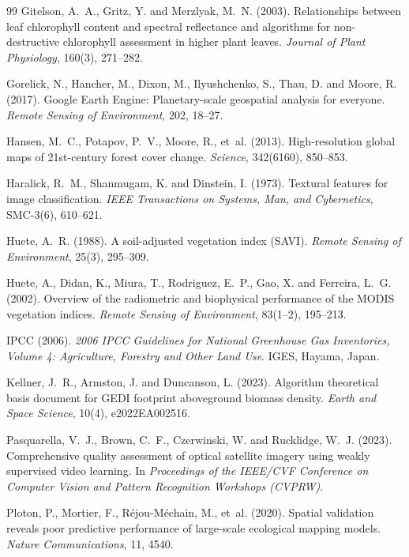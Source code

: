 \documentclass[11pt,a4paper]{article}
\begin{document}
\begin{thebibliography}{99}
Gitelson, A.~A., Gritz, Y. and Merzlyak, M.~N. (2003). Relationships between leaf chlorophyll
content and spectral reflectance and algorithms for non-destructive chlorophyll assessment in
higher plant leaves. \textit{Journal of Plant Physiology}, 160(3), 271--282.

Gorelick, N., Hancher, M., Dixon, M., Ilyushchenko, S., Thau, D. and Moore, R. (2017). Google
Earth Engine: Planetary-scale geospatial analysis for everyone. \textit{Remote Sensing of
Environment}, 202, 18--27.

Hansen, M.~C., Potapov, P.~V., Moore, R., et~al. (2013). High-resolution global maps of
21st-century forest cover change. \textit{Science}, 342(6160), 850--853.

Haralick, R.~M., Shanmugam, K. and Dinstein, I. (1973). Textural features for image
classification. \textit{IEEE Transactions on Systems, Man, and Cybernetics}, SMC-3(6),
610--621.

Huete, A.~R. (1988). A soil-adjusted vegetation index (SAVI). \textit{Remote Sensing of
Environment}, 25(3), 295--309.

Huete, A., Didan, K., Miura, T., Rodriguez, E.~P., Gao, X. and Ferreira, L.~G. (2002).
Overview of the radiometric and biophysical performance of the MODIS vegetation indices.
\textit{Remote Sensing of Environment}, 83(1--2), 195--213.

IPCC (2006). \textit{2006 IPCC Guidelines for National Greenhouse Gas Inventories, Volume 4:
Agriculture, Forestry and Other Land Use}. IGES, Hayama, Japan.

Kellner, J.~R., Armston, J. and Duncanson, L. (2023). Algorithm theoretical basis document for
GEDI footprint aboveground biomass density. \textit{Earth and Space Science}, 10(4),
e2022EA002516.

Pasquarella, V.~J., Brown, C.~F., Czerwinski, W. and Rucklidge, W.~J. (2023). Comprehensive
quality assessment of optical satellite imagery using weakly supervised video learning. In
\textit{Proceedings of the IEEE/CVF Conference on Computer Vision and Pattern Recognition
Workshops (CVPRW)}.

Ploton, P., Mortier, F., R\'ejou-M\'echain, M., et~al. (2020). Spatial validation reveals poor
predictive performance of large-scale ecological mapping models. \textit{Nature
Communications}, 11, 4540.


\end{thebibliography}
\end{document}
